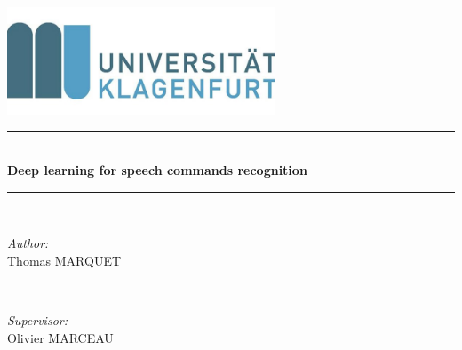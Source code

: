
\begin{titlepage}
\newcommand{\HRule}{\rule{\linewidth}{0.5mm}} %

\center %
 

\includegraphics[width=0.6\textwidth]{csm_AAU_neu_60b57104bf.jpg}


\HRule \\[0.8cm]
{ \huge \bfseries Deep learning for speech commands recognition}\\[0.4cm] %
\HRule \\[1.5cm]

\centering
\begin{minipage}{0.4\textwidth}
\begin{flushleft} \large
\emph{Author:}\\
Thomas \textsc{MARQUET} %
\end{flushleft}
\end{minipage}
~
\begin{minipage}{0.4\textwidth}
\begin{flushright} \large
\emph{Supervisor:} \\
Olivier
 \textsc{MARCEAU} %
\end{flushright}
\end{minipage}\\[2cm]
\end{titlepage}